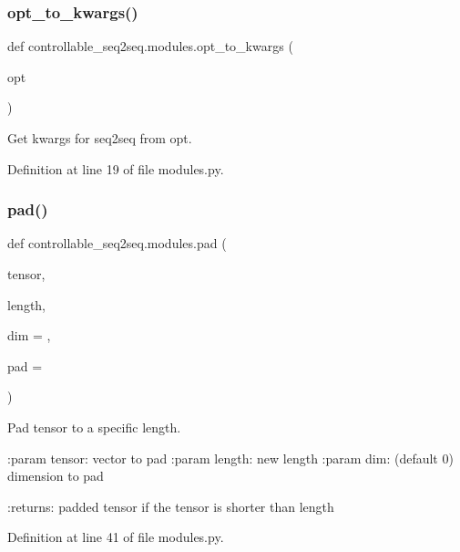 \subsubsection{\texorpdfstring{opt\+\_\+to\+\_\+kwargs()}{opt\_to\_kwargs()}}
{\footnotesize\ttfamily def controllable\+\_\+seq2seq.\+modules.\+opt\+\_\+to\+\_\+kwargs (\begin{DoxyParamCaption}\item[{}]{opt }\end{DoxyParamCaption})}

\begin{DoxyVerb}Get kwargs for seq2seq from opt.\end{DoxyVerb}
 

Definition at line 19 of file modules.\+py.

\mbox{\label{namespacecontrollable__seq2seq_1_1modules_a0a1785427c3f3fdbb88c1b3cb0d9020c}} 
\subsubsection{\texorpdfstring{pad()}{pad()}}
{\footnotesize\ttfamily def controllable\+\_\+seq2seq.\+modules.\+pad (\begin{DoxyParamCaption}\item[{}]{tensor,  }\item[{}]{length,  }\item[{}]{dim = {},  }\item[{}]{pad = {} }\end{DoxyParamCaption})}

\begin{DoxyVerb}Pad tensor to a specific length.

:param tensor: vector to pad
:param length: new length
:param dim: (default 0) dimension to pad

:returns: padded tensor if the tensor is shorter than length
\end{DoxyVerb}
 

Definition at line 41 of file modules.\+py.

